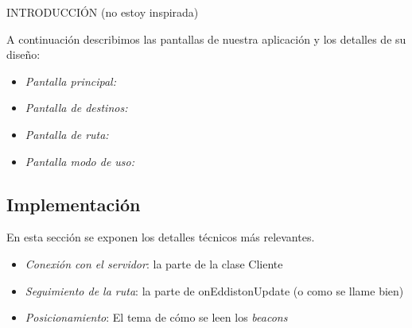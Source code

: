 INTRODUCCIÓN (no estoy inspirada)

A continuación describimos las pantallas de nuestra aplicación y los detalles de su diseño:

\begin{itemize}
	\item \textit{Pantalla principal:}
	
	\item \textit{Pantalla de destinos:}
	
	\item \textit{Pantalla de ruta:}
	
	\item \textit{Pantalla modo de uso:}
\end{itemize}

\subsection{Implementación}

En esta sección se exponen los detalles técnicos más relevantes. 

\begin{itemize}
	\item \textit{Conexión con el servidor}: la parte de la clase Cliente
	\item \textit{Seguimiento de la ruta}: la parte de onEddistonUpdate (o como se llame bien)
	\item \textit{Posicionamiento}: El tema de cómo se leen los \textit{beacons}
\end{itemize}
